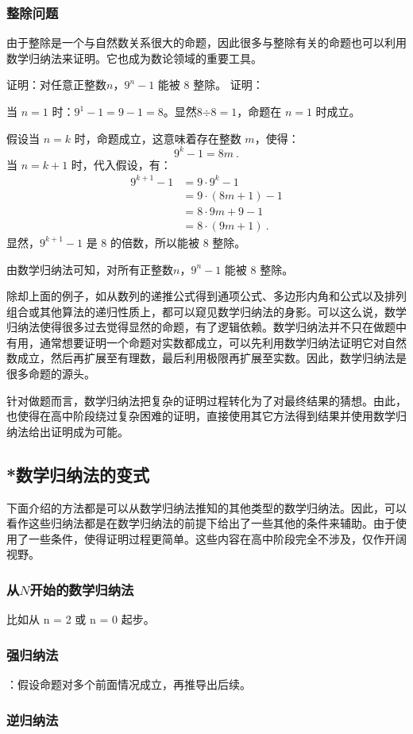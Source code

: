 \subsubsection{整除问题}

由于整除是一个与自然数关系很大的命题，因此很多与整除有关的命题也可以利用数学归纳法来证明。它也成为数论领域的重要工具。

\begin{example}{证明：对任意正整数$n$，$9^{n} - 1$ 能被 $8$ 整除。}
证明：

当 $n = 1$ 时：$9^1 - 1 = 9 - 1 = 8$。显然$8\text{÷}8=1$，命题在 $n = 1$ 时成立。

假设当 $n = k$ 时，命题成立，这意味着存在整数 $m$，使得：
\begin{equation}
9^k - 1 = 8m~.
\end{equation}
当 $n = k+1$ 时，代入假设，有：
\begin{equation}
\begin{aligned}
9^{k+1} - 1 &= 9\cdot9^{k} - 1\\
&= 9\cdot(8m+1)- 1\\
&= 8\cdot9m+9- 1\\
&= 8\cdot(9m+1)~.
\end{aligned}
\end{equation}
显然，$9^{k+1} - 1$ 是 $8$ 的倍数，所以能被 $8$ 整除。

由数学归纳法可知，对所有正整数$n$，$9^{n} - 1$ 能被 $8$ 整除。
\end{example}
除却上面的例子，如从数列的递推公式得到通项公式、多边形内角和公式以及排列组合或其他算法的递归性质上，都可以窥见数学归纳法的身影。可以这么说，数学归纳法使得很多过去觉得显然的命题，有了逻辑依赖。数学归纳法并不只在做题中有用，通常想要证明一个命题对实数都成立，可以先利用数学归纳法证明它对自然数成立，然后再扩展至有理数，最后利用极限再扩展至实数。因此，数学归纳法是很多命题的源头。

针对做题而言，数学归纳法把复杂的证明过程转化为了对最终结果的猜想。由此，也使得在高中阶段绕过复杂困难的证明，直接使用其它方法得到结果并使用数学归纳法给出证明成为可能。

\subsection{*数学归纳法的变式}

下面介绍的方法都是可以从数学归纳法推知的其他类型的数学归纳法。因此，可以看作这些归纳法都是在数学归纳法的前提下给出了一些其他的条件来辅助。由于使用了一些条件，使得证明过程更简单。这些内容在高中阶段完全不涉及，仅作开阔视野。

\subsubsection{从$N$开始的数学归纳法}
比如从 n = 2 或 n = 0 起步。

\subsubsection{强归纳法}

：假设命题对多个前面情况成立，再推导出后续。

\subsubsection{逆归纳法}
